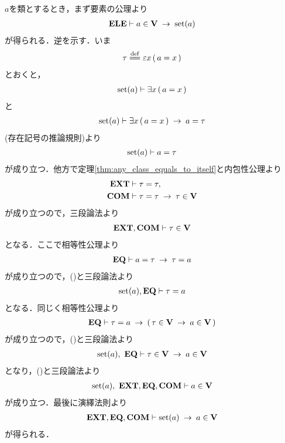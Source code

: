 	\begin{prf}
		$a$を類とするとき，まず要素の公理より
		\begin{align}
			\mbox{{\bf ELE}} \vdash a \in \mathbf{V} \hspace{0.25em}\rightarrow\hspace{0.25em} \operatorname*{set} (a)
		\end{align}
		が得られる．逆を示す．いま
		\begin{align}
			\tau \defeq \varepsilon x\, (\, a = x\, )
		\end{align}
		とおくと，
		\begin{align}
			\operatorname*{set} (a) \vdash \exists x\, (\, a = x\, )
		\end{align}
		と
		\begin{align}
			\operatorname*{set} (a) \vdash \exists x\, (\, a = x\, ) \hspace{0.25em}\rightarrow\hspace{0.25em} a = \tau
		\end{align}
		(存在記号の推論規則)より
		\begin{align}
			\operatorname*{set} (a) \vdash a = \tau
			\label{fom:thm_V_is_the_whole_of_sets_1}
		\end{align}
		が成り立つ．他方で定理\ref{thm:any_class_equals_to_itself}と内包性公理より
		\begin{align}
			\mbox{{\bf EXT}} &\vdash \tau = \tau, \\
			\mbox{\bf COM} &\vdash \tau = \tau \hspace{0.25em}\rightarrow\hspace{0.25em} \tau \in \mathbf{V}
		\end{align}
		が成り立つので，三段論法より
		\begin{align}
			\mbox{{\bf EXT}},\mbox{\bf COM} \vdash \tau \in \mathbf{V}
			\label{fom:thm_V_is_the_whole_of_sets_2}
		\end{align}
		となる．ここで相等性公理より
		\begin{align}
			\mbox{{\bf EQ}} \vdash a = \tau \hspace{0.25em}\rightarrow\hspace{0.25em} \tau = a
		\end{align}
		が成り立つので，()と三段論法より
		\begin{align}
			\operatorname*{set} (a),\mbox{{\bf EQ}} \vdash \tau = a
			\label{fom:thm_V_is_the_whole_of_sets_3}
		\end{align}
		となる．同じく相等性公理より
		\begin{align}
			\mbox{{\bf EQ}} \vdash \tau = a \hspace{0.25em}\rightarrow\hspace{0.25em} (\, \tau \in \mathbf{V} \hspace{0.25em}\rightarrow\hspace{0.25em} a \in \mathbf{V}\, )
		\end{align}
		が成り立つので，()と三段論法より
		\begin{align}
			\operatorname*{set} (a),\ \mbox{{\bf EQ}} \vdash \tau \in \mathbf{V} \hspace{0.25em}\rightarrow\hspace{0.25em} a \in \mathbf{V}
		\end{align}
		となり，()と三段論法より
		\begin{align}
			\operatorname*{set} (a),\ \mbox{{\bf EXT}},\mbox{{\bf EQ}},\mbox{\bf COM} \vdash a \in \mathbf{V}
		\end{align}
		が成り立つ．最後に演繹法則より
		\begin{align}
			\mbox{{\bf EXT}},\mbox{{\bf EQ}},\mbox{\bf COM} \vdash \operatorname*{set} (a) \hspace{0.25em}\rightarrow\hspace{0.25em} a \in \mathbf{V}
		\end{align}
		が得られる．
		\QED
	\end{prf}
	
